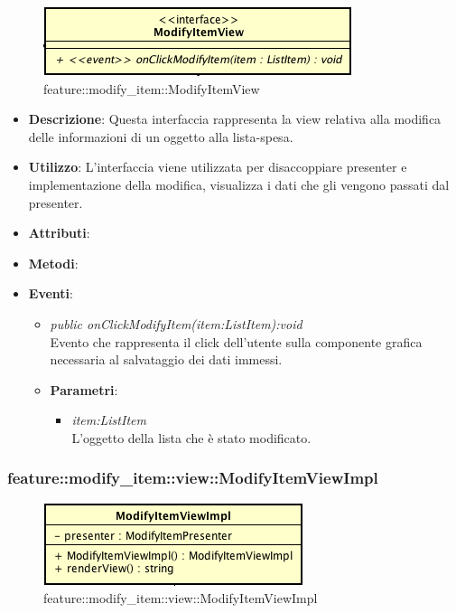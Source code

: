 \label{feature::modify_item::ModifyItemView}
\begin{figure}[ht]
	\centering
	\includegraphics[scale=0.5]{Sezioni/SottosezioniST/img/app/ModifyItemView.png}
	\caption{feature::modify\_item::ModifyItemView}
\end{figure}

\begin{itemize}
\item \textbf{Descrizione}: Questa interfaccia rappresenta la view relativa alla modifica delle informazioni di un oggetto alla lista-spesa.
\item \textbf{Utilizzo}: L'interfaccia viene utilizzata per disaccoppiare presenter e implementazione della modifica, visualizza i dati che gli vengono passati dal presenter.
\item \textbf{Attributi}: 
\item \textbf{Metodi}:
\item \textbf{Eventi}:
	\begin{itemize}
	\item \textit{public onClickModifyItem(item:ListItem):void}\\
	Evento che rappresenta il click dell'utente sulla componente grafica necessaria al salvataggio dei dati immessi.
			\item{\textbf{Parametri}: \begin{itemize}
			\item \textit{item:ListItem}\\
			L'oggetto della lista che è stato modificato.
			\end{itemize}}
	\end{itemize}
\end{itemize}

\subsubsection{feature::modify\_item::view::ModifyItemViewImpl}

\label{feature::modify_item::view::ModifyItemViewImpl}
\begin{figure}[ht]
	\centering
	\includegraphics[scale=0.5]{Sezioni/SottosezioniST/img/app/ModifyItemViewImpl.png}
	\caption{feature::modify\_item::view::ModifyItemViewImpl}
\end{figure}

